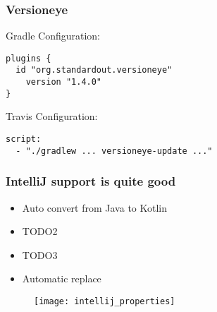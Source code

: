 
\begin{frame}[fragile] \frametitle{Versioneye} 
Gradle Configuration:

\begin{lstlisting}
plugins {
  id "org.standardout.versioneye"
    version "1.4.0"
}
\end{lstlisting}
\pause

Travis Configuration:

\begin{lstlisting}
script:
  - "./gradlew ... versioneye-update ..."
\end{lstlisting}
  
\end{frame}


\begin{frame}
\frametitle{IntelliJ support is quite good}
\begin{itemize}
	\item Auto convert from Java to Kotlin
	\item TODO2
	\item TODO3
	\item Automatic replace
\end{itemize}
\begin{figure}[h]
\centering
  \texttt{[image: intellij\_properties]}
\end{figure}

\end{frame}

